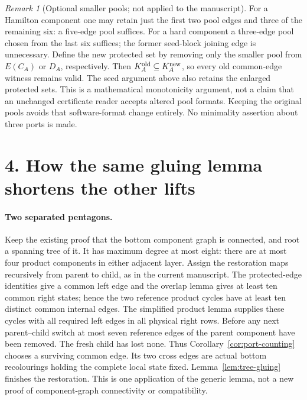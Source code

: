 \documentclass[11pt]{article}
\theoremstyle{remark}\newtheorem{remark}[lemma]{Remark}
\begin{document}
\begin{remark}[Optional smaller pools; not applied to the manuscript]
For a Hamilton component one may retain just the first two pool edges
and three of the remaining six: a five-edge pool suffices.
For a hard component a three-edge pool chosen from the last six
suffices; the former seed-block joining edge is unnecessary.
Define the new protected set by removing only the smaller pool from
$E(C_A)$ or $D_A$, respectively. Then $K_A^{\rm old}\subseteq
K_A^{\rm new}$, so every old common-edge witness remains valid.
The seed argument above also retains the enlarged protected sets.
This is a mathematical monotonicity argument, not a claim that an
unchanged certificate reader accepts altered pool formats. Keeping
the original pools avoids that software-format change entirely.
No minimality assertion about three ports is made.
\end{remark}

\section*{4. How the same gluing lemma shortens the other lifts}

\paragraph{Two separated pentagons.}
Keep the existing proof that the bottom component graph is connected,
and root a spanning tree of it. It has maximum degree at most eight:
there are at most four product components in either adjacent layer.
Assign the restoration maps recursively from parent to child, as in
the current manuscript. The protected-edge identities give a common
left edge and the overlap lemma gives at least ten common right
states; hence the two reference product cycles have at least ten
distinct common internal edges. The simplified product lemma supplies
these cycles with all required left edges in all physical right rows.
Before any next parent--child switch at most seven reference edges
of the parent component have been removed. The fresh child has lost
none. Thus Corollary~\ref{cor:port-counting} chooses a surviving
common edge. Its two cross edges are actual bottom recolourings
holding the complete local state fixed. Lemma~\ref{lem:tree-gluing}
finishes the restoration. This is one application of the generic
lemma, not a new proof of component-graph connectivity or compatibility.
\end{document}
